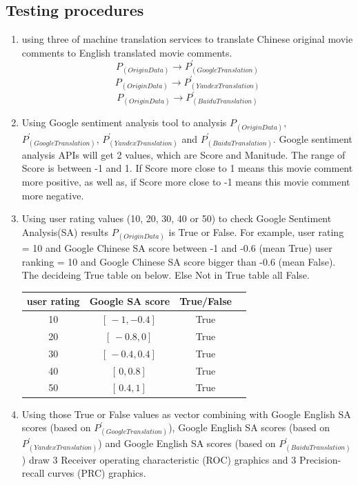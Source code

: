 \documentclass[conference]{IEEEtran}
\begin{document}
\subsection{Testing procedures}
\begin{enumerate}
  \item using three of machine translation services to translate Chinese
    original movie comments to English translated movie comments.
    $$P_{(Origin Data)} \rightarrow P^{\prime}_{(Google Translation)}$$
    $$P_{(Origin Data)} \rightarrow P^{\prime}_{(Yandex Translation)}$$
    $$P_{(Origin Data)} \rightarrow P^{\prime}_{(Baidu Translation)}$$
  \item Using Google sentiment analysis tool to analysis $P_{(Origin Data)}$,
    $P^{\prime}_{(Google Translation)}$, $ P^{\prime}_{(Yandex Translation)}$ and $
    P^{\prime}_{(Baidu Translation)}$. Google sentiment analysis APIs will get 2
    values, which are Score and Manitude. The range of Score is between -1 and
    1. If Score more close to 1 means this movie comment more positive, as well
    as, if Score more close to -1 means this movie comment more negative.
  \item Using user rating values (10, 20, 30, 40 or 50) to check Google
    Sentiment Analysis(SA) results $P_{(Origin Data)} $ is True or False. For example, user rating = 10 and Google Chinese SA score between -1
    and -0.6 (mean True) user ranking = 10 and Google Chinese SA score bigger
    than -0.6 (mean False). The decideing True table on below. Else Not in True
    table all False.\\
    \begin{center}
      \begin{tabular}{|c|c|c|c|}
        \hline
        user rating & Google SA score & True/False \\
        \hline\hline
        10 & $[ \, -1, -0.4 ] \,$ & True \\
        \hline
        20 & $[ \, -0.8, 0 ] \,$ & True \\
        \hline
        30 & $[ \, -0.4, 0.4 ] \,$ & True \\
        \hline
        40 & $[ \, 0, 0.8 ] \,$ & True \\
        \hline
        50 & $[ \, 0.4, 1 ] \,$ & True \\
        \hline
      \end{tabular}
    \end{center}
  \item Using those True or False values as vector combining with Google English
    SA scores (based on $P^{\prime}_{(Google Translation)}$), Google English SA
    scores (based on $ P^{\prime}_{(Yandex Translation)}$) and Google English SA
    scores (based on $P^{\prime}_{(Baidu Translation)}$) draw 3 Receiver operating
    characteristic (ROC) graphics and 3 Precision-recall curves (PRC) graphics.


\end{enumerate}
\end{document}

